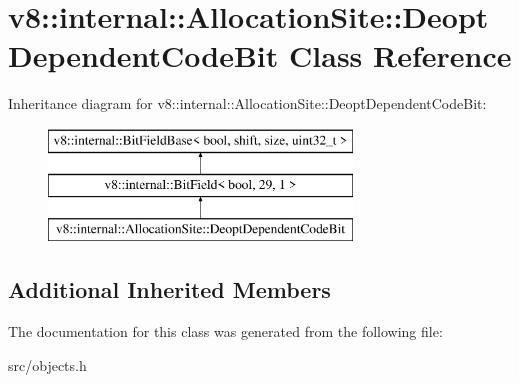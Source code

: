 \hypertarget{classv8_1_1internal_1_1_allocation_site_1_1_deopt_dependent_code_bit}{}\section{v8\+:\+:internal\+:\+:Allocation\+Site\+:\+:Deopt\+Dependent\+Code\+Bit Class Reference}
\label{classv8_1_1internal_1_1_allocation_site_1_1_deopt_dependent_code_bit}
Inheritance diagram for v8\+:\+:internal\+:\+:Allocation\+Site\+:\+:Deopt\+Dependent\+Code\+Bit\+:\begin{figure}[H]
\begin{center}
\leavevmode
\includegraphics[height=3.000000cm]{classv8_1_1internal_1_1_allocation_site_1_1_deopt_dependent_code_bit}
\end{center}
\end{figure}
\subsection*{Additional Inherited Members}


The documentation for this class was generated from the following file\+:\begin{DoxyCompactItemize}
\item 
src/objects.\+h\end{DoxyCompactItemize}
